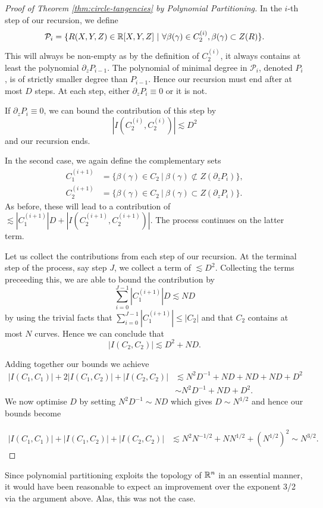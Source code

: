 \begin{proof}[Proof of Theorem \ref{thm:circle-tangencies} by Polynomial Partitioning]
In the $i$-th step of our recursion, we define
\[
    \mathcal P_i  = \{ R(X,Y,Z) \in \mathbb R[X,Y,Z] \ | \ \forall \beta(\gamma) \in C_2^{(i)}, \beta(\gamma) \subset Z(R) \}. 
\]
This will always be non-empty as by the definition of $C_2^{(i)}$, it always contains at least the polynomial $\partial_z P_{i-1}$. The polynomial of minimal degree in $\mathcal P_i$, denoted $P_i$, is of strictly smaller degree than $P_{i-1}$. Hence our recursion must end after at most $D$ steps. At each step, either $\partial_z P_i \equiv 0$ or it is not. 

If $\partial_z P_i \equiv 0$, we can bound the contribution of this step by 
\[\left|I\left(C_2^{(i)},C_2^{(i)}\right)\right| \lesssim D^2\] 
and our recursion ends.

In the second case, we again define the complementary sets
\begin{align*}
    C_1^{(i+1)} &= \{ \beta(\gamma) \in C_2 \ | \  \beta(\gamma) \not \subset Z(\partial_z P_i)  \}, \\
    C_2^{(i+1)} &=  \{ \beta(\gamma) \in C_2 \ | \  \beta(\gamma) \subset Z(\partial_z P_i)  \}.
\end{align*}
As before, these will lead to a contribution of $\lesssim \left|  C_1^{(i+1)}\right| D + \left|I \left( C_2^{(i+1)},C_2^{(i+1)} \right) \right|$. The process continues on the latter term.

Let us collect the contributions from each step of our recursion. At the terminal step of the process, say step $J$,  we collect a term of $\lesssim D^2$. Collecting the terms preceeding this, we are able to bound the contribution by 
\[
    \sum_{i=0}^{J-1} \left| C_1^{(i+1)} \right| D \lesssim N D
\]
by using the trivial facts that $\sum_{i=0}^{J-1} \left| C_1^{(i+1)} \right| \leq |C_2|$ and that $C_2$ contains at most $N$ curves. Hence we can conclude that
\[
  |I(C_2,C_2)| \lesssim D^2 + ND.
\]


Adding together our bounds we achieve
\begin{align*}
    |I(C_1,C_1)|+2|I(C_1,C_2)|+|I(C_2,C_2)| &\lesssim N^2D^{-1} + ND + ND + ND + D^2 \\
    &\sim N^2D^{-1} + ND + D^2.
\end{align*}
We now optimise $D$ by setting $N^2D^{-1} \sim ND$ which gives $D \sim N^{1/2}$ and hence our bounds become

\begin{align*}
    |I(C_1,C_1)|+|I(C_1,C_2)|+|I(C_2,C_2)| &\lesssim N^2N^{-1/2} + NN^{1/2} + (N^{1/2})^2 \sim N^{3/2}.
\end{align*}
\end{proof}
\begin{remark}
    Since polynomial partitioning exploits the topology of $\mathbb R^n$ in an essential manner, it would have been reasonable to expect an improvement over the exponent 3/2 via the argument above. Alas, this was not the case.
\end{remark}


